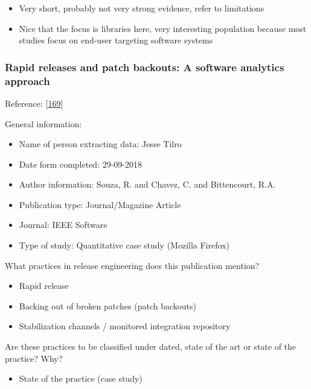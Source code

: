 \documentclass[]{book}
\providecommand{\tightlist}{%
  \setlength{\itemsep}{0pt}\setlength{\parskip}{0pt}}
\begin{document}
\begin{itemize}
\tightlist
\item
  Very short, probably not very strong evidence, refer to limitations
\item
  Nice that the focus is libraries here, very interesting population
  because most studies focus on end-user targeting software systems
\end{itemize}

\subsubsection{Rapid releases and patch backouts: A software analytics
approach}\label{rapid-releases-and-patch-backouts-a-software-analytics-approach}

Reference: {[}\protect\hyperlink{ref-souza2015a}{169}{]}

General information:

\begin{itemize}
\tightlist
\item
  Name of person extracting data: Jesse Tilro
\item
  Date form completed: 29-09-2018
\item
  Author information: Souza, R. and Chavez, C. and Bittencourt, R.A.
\item
  Publication type: Journal/Magazine Article
\item
  Journal: IEEE Software
\item
  Type of study: Quantitative case study (Mozilla Firefox)
\end{itemize}

What practices in release engineering does this publication mention?

\begin{itemize}
\tightlist
\item
  Rapid release
\item
  Backing out of broken patches (patch backouts)
\item
  Stabilization channels / monitored integration repository
\end{itemize}

Are these practices to be classified under dated, state of the art or
state of the practice? Why?

\begin{itemize}
\tightlist
\item
  State of the practice (case study)
\end{itemize}
\end{document}
